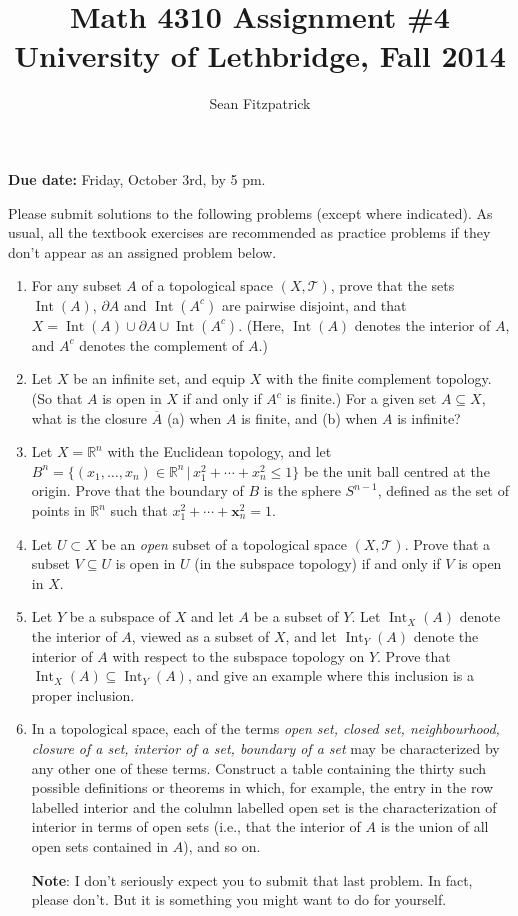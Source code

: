 \documentclass[letterpaper,12pt]{article}
\title{Math 4310 Assignment \#4\\University of Lethbridge, Fall 2014}
\author{Sean Fitzpatrick}
\newcommand{\R}{\mathbb{R}}
\newcommand{\x}{\mathbf{x}}
\newcommand{\T}{\mathcal{T}}
\DeclareMathOperator{\Int}{Int}
\begin{document}
 \maketitle

{\bf Due date:} Friday, October 3rd, by 5 pm.

\bigskip

Please submit solutions to the following problems (except where indicated). As usual, all the textbook exercises are recommended as practice problems if they don't appear as an assigned problem below.

\begin{enumerate}
\item For any subset $A$ of a topological space $(X,\T)$, prove that the sets $\Int(A)$, $\partial A$ and $\Int(A^c)$ are pairwise disjoint, and that $X = \Int(A)\cup \partial A\cup \Int(A^c)$. (Here, $\Int(A)$ denotes the interior of $A$, and $A^c$ denotes the complement of $A$.)

\item Let $X$ be an infinite set, and equip $X$ with the finite complement topology. (So that $A$ is open in $X$ if and only if $A^c$ is finite.) For a given set $A\subseteq X$, what is the closure $\overline{A}$ (a) when $A$ is finite, and (b) when $A$ is infinite?

\item Let $X=\R^n$ with the Euclidean topology, and let $B^n=\{(x_1,\ldots, x_n)\in\R^n\,|\, x_1^2+\cdots +x_n^2\leq 1\}$ be the unit ball centred at the origin. Prove that the boundary of $B$ is the sphere $S^{n-1}$, defined as the set of points in $\R^n$ such that $x_1^2+\cdots + \x_n^2 = 1$.

\item Let $U\subset X$ be an {\em open} subset of a topological space $(X,\T)$. Prove that a subset $V\subseteq U$ is open in $U$ (in the subspace topology) if and only if $V$ is open in $X$.

\item Let $Y$ be a subspace of $X$ and let $A$ be a subset of $Y$. Let $\Int_X(A)$ denote the interior of $A$, viewed as a subset of $X$, and let $\Int_Y(A)$ denote the interior of $A$ with respect to the subspace topology on $Y$. Prove that $\Int_X(A)\subseteq \Int_Y(A)$, and give an example where this inclusion is a proper inclusion.

\item In a topological space, each of the terms {\em open set, closed set, neighbourhood, closure of a set,  interior of a set, boundary of a set} may be characterized by any other one of these terms. Construct a table containing the thirty such possible definitions or theorems in which, for example, the entry in the row labelled interior and the colulmn labelled open set is the characterization of interior in terms of open sets (i.e., that the interior of $A$ is the union of all open sets contained in $A$), and so on.

{\bf Note}: I don't seriously expect you to submit that last problem. In fact, please don't. But it is something you might want to do for yourself.

\end{enumerate}
\end{document}
